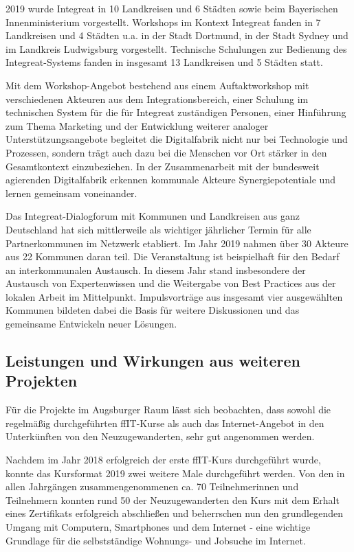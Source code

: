 \documentclass[12pt, a4paper]{article} %
\begin{document}
2019 wurde Integreat in 10 Landkreisen und 6 Städten sowie beim
Bayerischen Innenministerium vorgestellt. Workshops im Kontext Integreat
fanden in 7 Landkreisen und 4 Städten u.a. in der Stadt Dortmund, in der
Stadt Sydney und im Landkreis Ludwigsburg vorgestellt. Technische
Schulungen zur Bedienung des Integreat-Systems fanden in insgesamt 13
Landkreisen und 5 Städten statt.

Mit dem Workshop-Angebot bestehend aus einem Auftaktworkshop mit
verschiedenen Akteuren aus dem Integrationsbereich, einer Schulung im
technischen System für die für Integreat zuständigen Personen, einer
Hinführung zum Thema Marketing und der Entwicklung weiterer analoger
Unterstützungsangebote begleitet die Digitalfabrik nicht nur bei
Technologie und Prozessen, sondern trägt auch dazu bei die Menschen vor
Ort stärker in den Gesamtkontext einzubeziehen. In der Zusammenarbeit
mit der bundesweit agierenden Digitalfabrik erkennen kommunale Akteure
Synergiepotentiale und lernen gemeinsam voneinander.

Das Integreat-Dialogforum mit Kommunen und Landkreisen aus ganz
Deutschland hat sich mittlerweile als wichtiger jährlicher Termin für
alle Partnerkommunen im Netzwerk etabliert. Im Jahr 2019 nahmen über 30
Akteure aus 22 Kommunen daran teil. Die Veranstaltung ist beispielhaft
für den Bedarf an interkommunalen Austausch. In diesem Jahr stand
insbesondere der Austausch von Expertenwissen und die Weitergabe von
Best Practices aus der lokalen Arbeit im Mittelpunkt. Impulsvorträge aus
insgesamt vier ausgewählten Kommunen bildeten dabei die Basis für
weitere Diskussionen und das gemeinsame Entwickeln neuer Lösungen.

\hypertarget{leistungen-und-wirkungen-aus-weiteren-projekten}{%
\subsection{Leistungen und Wirkungen aus weiteren
Projekten}\label{leistungen-und-wirkungen-aus-weiteren-projekten}}

Für die Projekte im Augsburger Raum lässt sich beobachten, dass sowohl
die regelmäßig durchgeführten ffIT-Kurse als auch das Internet-Angebot
in den Unterkünften von den Neuzugewanderten, sehr gut angenommen
werden.

Nachdem im Jahr 2018 erfolgreich der erste ffIT-Kurs durchgeführt wurde,
konnte das Kursformat 2019 zwei weitere Male durchgeführt werden. Von
den in allen Jahrgängen zusammengenommenen ca. 70 Teilnehmerinnen und
Teilnehmern konnten rund 50 der Neuzugewanderten den Kurs mit dem Erhalt
eines Zertifikats erfolgreich abschließen und beherrschen nun den
grundlegenden Umgang mit Computern, Smartphones und dem Internet - eine
wichtige Grundlage für die selbstständige Wohnungs- und Jobsuche im
Internet.
\end{document}
